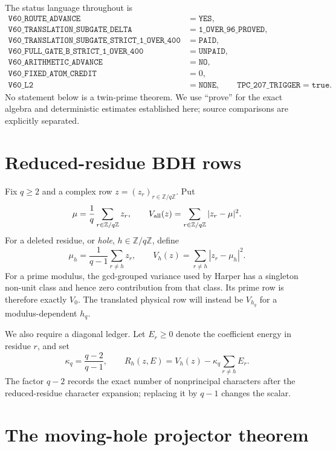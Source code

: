 \documentclass[11pt]{article}
\newcommand{\Fq}{\mathbb Z/q\mathbb Z}
\begin{document}
The status language throughout is
\begin{align*}
 \texttt{V60\_ROUTE\_ADVANCE}&=\texttt{YES},\\
 \texttt{V60\_TRANSLATION\_SUBGATE\_DELTA}&=\texttt{1\_OVER\_96\_PROVED},\\
 \texttt{V60\_TRANSLATION\_SUBGATE\_STRICT\_1\_OVER\_400}&=\texttt{PAID},\\
 \texttt{V60\_FULL\_GATE\_B\_STRICT\_1\_OVER\_400}&=\texttt{UNPAID},\\
 \texttt{V60\_ARITHMETIC\_ADVANCE}&=\texttt{NO},\\
 \texttt{V60\_FIXED\_ATOM\_CREDIT}&=0,\\
 \texttt{V60\_L2}&=\texttt{NONE},\qquad
 \texttt{TPC\_207\_TRIGGER}=\texttt{true}.
\end{align*}
No statement below is a twin-prime theorem.  We use ``prove'' for the exact
algebra and deterministic estimates established here; source comparisons are
explicitly separated.

\section{Reduced-residue BDH rows}

Fix $q\ge2$ and a complex row $z=(z_r)_{r\in\Fq}$.  Put
\[
 \mu=\frac1q\sum_{r\in\Fq}z_r,
 \qquad
 V_{\rm all}(z)=\sum_{r\in\Fq}|z_r-\mu|^2.
\]
For a deleted residue, or \emph{hole}, $h\in\Fq$, define
\[
 \mu_h=\frac1{q-1}\sum_{r\ne h}z_r,
 \qquad
 V_h(z)=\sum_{r\ne h}|z_r-\mu_h|^2.
\]
For a prime modulus, the gcd-grouped variance used by Harper
\cite{Harper2024} has a singleton non-unit class and hence zero contribution
from that class.  Its prime row is therefore exactly $V_0$.  The translated
physical row will instead be $V_{h_q}$ for a modulus-dependent $h_q$.

We also require a diagonal ledger.  Let $E_r\ge0$ denote the coefficient
energy in residue $r$, and set
\begin{equation}\label{eq:remainder}
 \kappa_q=\frac{q-2}{q-1},
 \qquad
 R_h(z,E)=V_h(z)-\kappa_q\sum_{r\ne h}E_r.
\end{equation}
The factor $q-2$ records the exact number of nonprincipal characters after
the reduced-residue character expansion; replacing it by $q-1$ changes the
scalar.

\section{The moving-hole projector theorem}
\end{document}
